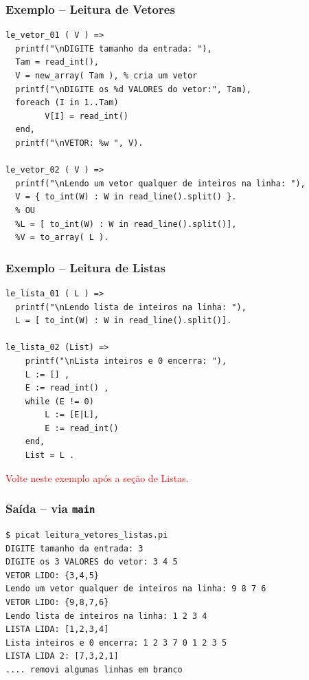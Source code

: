 \begin{frame}[fragile]
\frametitle{Exemplo -- Leitura de Vetores}    

\begin{footnotesize}
\begin{verbatim}
le_vetor_01 ( V ) =>
  printf("\nDIGITE tamanho da entrada: "),
  Tam = read_int(),
  V = new_array( Tam ), % cria um vetor
  printf("\nDIGITE os %d VALORES do vetor:", Tam),
  foreach (I in 1..Tam)
        V[I] = read_int()
  end,
  printf("\nVETOR: %w ", V).
  
le_vetor_02 ( V ) =>  
  printf("\nLendo um vetor qualquer de inteiros na linha: "),
  V = { to_int(W) : W in read_line().split() }.
  % OU
  %L = [ to_int(W) : W in read_line().split()],
  %V = to_array( L ).
\end{verbatim}
\end{footnotesize}       
\end{frame}


\begin{frame}[fragile]
\frametitle{Exemplo -- Leitura de  Listas}    

\begin{footnotesize}
\begin{verbatim}
le_lista_01 ( L ) =>  
  printf("\nLendo lista de inteiros na linha: "),
  L = [ to_int(W) : W in read_line().split()].
  
le_lista_02 (List) =>  
    printf("\nLista inteiros e 0 encerra: "),
    L := [] ,
    E := read_int() ,
    while (E != 0)  
        L := [E|L],  
        E := read_int()  
    end,  
    List = L .
\end{verbatim}
\end{footnotesize}       
\textcolor{red}{Volte neste exemplo após a seção de Listas.}          
\end{frame}


\begin{frame}[fragile]
\frametitle{Saída -- via \texttt{main}}    

\begin{footnotesize}
\begin{verbatim}
$ picat leitura_vetores_listas.pi 
DIGITE tamanho da entrada: 3
DIGITE os 3 VALORES do vetor: 3 4 5
VETOR LIDO: {3,4,5} 
Lendo um vetor qualquer de inteiros na linha: 9 8 7 6 
VETOR LIDO: {9,8,7,6} 
Lendo lista de inteiros na linha: 1 2 3 4 
LISTA LIDA: [1,2,3,4] 
Lista inteiros e 0 encerra: 1 2 3 7 0 1 2 3 5
LISTA LIDA 2: [7,3,2,1] 
.... removi algumas linhas em branco
\end{verbatim}
\end{footnotesize}       
\end{frame}

